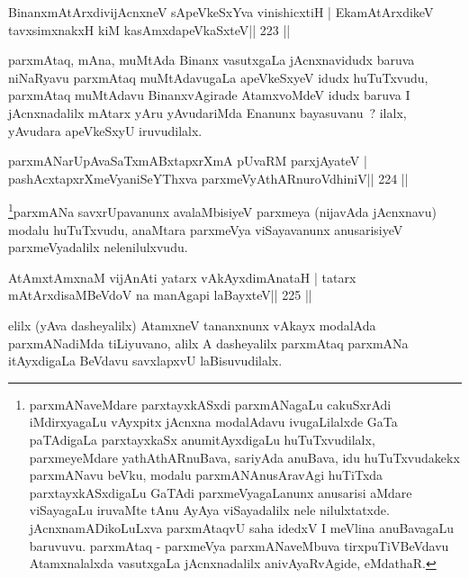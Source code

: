 \begin{shl}
BinanxmAtArxdivijAcnxneV sApeVkeSxYva vinishicxtiH |
EkamAtArxdikeV tavxsimxnakxH kiM kasAmxdapeVkaSxteV\hfill || 223 ||
\end{shl}

\begin{artha}
parxmAtaq, mAna, muMtAda Binanx vasutxgaLa jAcnxnavidudx baruva niNaRyavu parxmAtaq muMtAdavugaLa apeVkeSxyeV idudx huTuTxvudu, parxmAtaq muMtAdavu BinanxvAgirade AtamxvoMdeV idudx baruva I jAcnxnadalilx mAtarx yAru yAvudariMda Enanunx bayasuvanu~? ilalx, yAvudara apeVkeSxyU iruvudilalx.
\end{artha}


\begin{shl}
parxmANarUpAvaSaTxmABxtapxrXmA pUvaRM parxjAyateV |
pashAcxtapxrXmeVyaniSeYThxva parxmeVyAthARnuroVdhiniV\hfill || 224 ||
\end{shl}

\begin{artha}
\footnote[1]{parxmANaveMdare parxtayxkASxdi parxmANagaLu cakuSxrAdi iMdirxyagaLu vAyxpitx jAcnxna modalAdavu ivugaLilalxde GaTa paTAdigaLa parxtayxkaSx anumitAyxdigaLu huTuTxvudilalx, parxmeyeMdare yathAthARnuBava, sariyAda anuBava, idu huTuTxvudakekx parxmANavu beVku, modalu parxmANAnusAravAgi huTiTxda parxtayxkASxdigaLu GaTAdi parxmeVyagaLanunx anusarisi aMdare viSayagaLu iruvaMte tAnu AyAya viSayadalilx nele nilulxtatxde. jAcnxnamADikoLuLxva parxmAtaqvU saha idedxV I meVlina anuBavagaLu baruvuvu. parxmAtaq - parxmeVya parxmANaveMbuva tirxpuTiVBeVdavu Atamxnalalxda vasutxgaLa jAcnxnadalilx anivAyaRvAgide, eMdathaR.}parxmANa savxrUpavanunx avalaMbisiyeV parxmeya (nijavAda jAcnxnavu) modalu huTuTxvudu, anaMtara parxmeVya viSayavanunx anusarisiyeV parxmeVyadalilx nelenilulxvudu.
\end{artha}


\begin{shl}
AtAmx\s\s tAmxnaM vijAnAti yatarx vAkAyxdimAnataH |
tatarx mAtArxdisaMBeVdoV na manAgapi laBayxteV\hfill || 225 ||
\end{shl}

\begin{artha}
elilx (yAva dasheyalilx) AtamxneV tananxnunx vAkayx modalAda parxmANadiMda tiLiyuvano, alilx A dasheyalilx parxmAtaq parxmANa itAyxdigaLa BeVdavu savxlapxvU laBisuvudilalx.
\end{artha}

